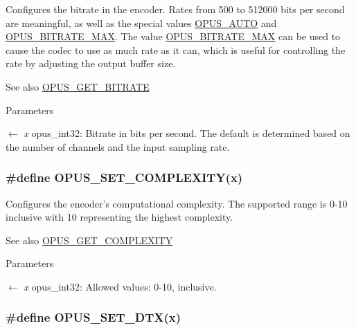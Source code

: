 Configures the bitrate in the encoder. Rates from 500 to 512000 bits per second are meaningful, as well as the special values \hyperlink{group__opus__ctlvalues_ga1c5b3244b018ff4548d2d6bffa418472}{OPUS\_\-AUTO} and \hyperlink{group__opus__ctlvalues_gaeadbaa3b4b9e15d39cd1d6e7d91519e5}{OPUS\_\-BITRATE\_\-MAX}. The value \hyperlink{group__opus__ctlvalues_gaeadbaa3b4b9e15d39cd1d6e7d91519e5}{OPUS\_\-BITRATE\_\-MAX} can be used to cause the codec to use as much rate as it can, which is useful for controlling the rate by adjusting the output buffer size. \begin{DoxySeeAlso}{See also}
\hyperlink{group__opus__encoderctls_ga1427a5560cbc7e9a59f986d89c05082c}{OPUS\_\-GET\_\-BITRATE} 
\end{DoxySeeAlso}

\begin{DoxyParams}{Parameters}
\item[\mbox{$\leftarrow$} {\em x}]{\ttfamily opus\_\-int32}: Bitrate in bits per second. The default is determined based on the number of channels and the input sampling rate. \end{DoxyParams}
\hypertarget{group__opus__encoderctls_ga3483877bf1687a75dd4a1de6f85f291c}{
\subsubsection[{OPUS\_\-SET\_\-COMPLEXITY}]{\setlength{\rightskip}{0pt plus 5cm}\#define OPUS\_\-SET\_\-COMPLEXITY(x)}}
\label{group__opus__encoderctls_ga3483877bf1687a75dd4a1de6f85f291c}


Configures the encoder's computational complexity. The supported range is 0-\/10 inclusive with 10 representing the highest complexity. \begin{DoxySeeAlso}{See also}
\hyperlink{group__opus__encoderctls_ga89755ee721a38d964c7630a920eb27d2}{OPUS\_\-GET\_\-COMPLEXITY} 
\end{DoxySeeAlso}

\begin{DoxyParams}{Parameters}
\item[\mbox{$\leftarrow$} {\em x}]{\ttfamily opus\_\-int32}: Allowed values: 0-\/10, inclusive. \end{DoxyParams}
\hypertarget{group__opus__encoderctls_ga4f053b2db8c5162293213aabfe123773}{
\subsubsection[{OPUS\_\-SET\_\-DTX}]{\setlength{\rightskip}{0pt plus 5cm}\#define OPUS\_\-SET\_\-DTX(x)}}
\label{group__opus__encoderctls_ga4f053b2db8c5162293213aabfe123773}


